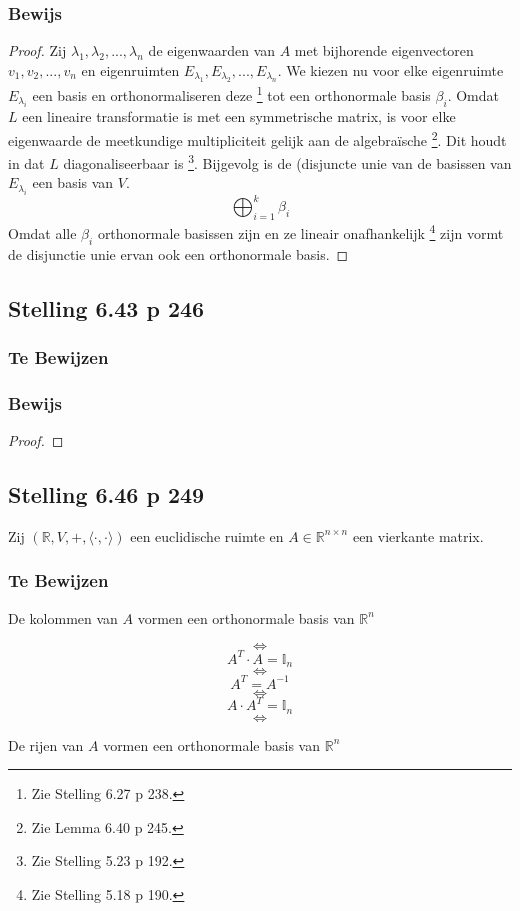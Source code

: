 \documentclass[lineaire_algebra_oplossingen.tex]{subfiles}
\begin{document}
\subsubsection*{Bewijs}
\begin{proof}
Zij $\lambda_1,\lambda_2,...,\lambda_n$ de eigenwaarden van $A$ met bijhorende eigenvectoren $v_1,v_2,...,v_n$ en eigenruimten $E_{\lambda_1},E_{\lambda_2},...,E_{\lambda_n}$.
We kiezen nu voor elke eigenruimte $E_{\lambda_i}$ een basis en orthonormaliseren deze \footnote{Zie Stelling 6.27 p 238.} tot een orthonormale basis $\beta_i$.
Omdat $L$ een lineaire transformatie is met een symmetrische matrix, is voor elke eigenwaarde de meetkundige multipliciteit gelijk aan de algebra\"ische \footnote{Zie Lemma 6.40 p 245.}.
Dit houdt in dat $L$ diagonaliseerbaar is \footnote{Zie Stelling 5.23 p 192.}.
Bijgevolg is de (disjuncte unie van de basissen van $E_{\lambda_i}$ een basis van $V$.
\[
\bigoplus_{i=1}^k \beta_i
\]
Omdat alle $\beta_i$ orthonormale basissen zijn en ze lineair onafhankelijk \footnote{Zie Stelling 5.18 p 190.} zijn vormt de disjunctie unie ervan ook een orthonormale basis.
\end{proof}


\subsection{Stelling 6.43 p 246}
\subsubsection*{Te Bewijzen}
\subsubsection*{Bewijs}
\begin{proof}

\end{proof}


\subsection{Stelling 6.46 p 249}
Zij $(\mathbb{R},V,+,\langle \cdot , \cdot \rangle)$ een euclidische ruimte en $A\in \mathbb{R}^{n\times n}$ een vierkante matrix.
\subsubsection*{Te Bewijzen}
\begin{center}
De kolommen van $A$ vormen een orthonormale basis van $\mathbb{R}^n$
\end{center}
\[\Leftrightarrow\]
\[A^T \cdot A = \mathbb{I}_n\]
\[\Leftrightarrow\]
\[A^T =A^{-1}\]
\[\Leftrightarrow\]
\[A \cdot A^T = \mathbb{I}_n\]
\[\Leftrightarrow\]
\begin{center}
De rijen van $A$ vormen een orthonormale basis van $\mathbb{R}^n$
\end{center}
\end{document}
